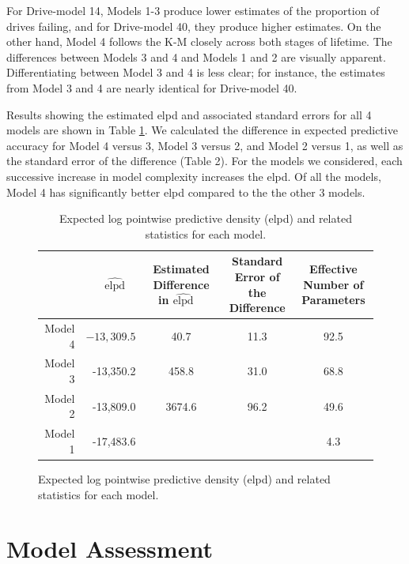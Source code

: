 \documentclass[11pt]{article}
\begin{document}
For Drive-model 14, Models 1-3 produce lower estimates of the proportion of drives failing, and for Drive-model 40, they produce higher estimates.  On the other hand, Model 4 follows the K-M closely across both stages of lifetime.  The differences between Models 3 and 4 and Models 1 and 2 are visually apparent.  Differentiating between Model 3 and 4 is less clear; for instance, the estimates from Model 3 and 4 are nearly identical for Drive-model 40.


Results showing the estimated elpd and associated standard errors for all 4 models are shown in Table \ref{table:2}.
We calculated the difference in expected predictive accuracy for Model 4 versus 3, Model 3 versus 2, and Model 2 versus 1, as well as the standard error of the difference (Table 2). For the models we considered, each successive increase in model complexity increases the elpd.  Of all the models, Model 4 has significantly better elpd compared to the the other 3 models.

\begin{figure}
\begin{table}[H]
\centering
\begin{tabular}{rrccc}
  \hline
 & $\widehat{\text{elpd}}$ \ & \thead{Estimated Difference \\ in $\widehat{\text{elpd}}$} \ & \thead{Standard Error of \\ the Difference} & \thead{Effective Number of \\ Parameters}\\ 
  \hline
Model 4 & $-13{,}309.5$ & 40.7 & 11.3 & 92.5 \\ 
Model 3 & -13{,}350.2 & 458.8 & 31.0 & 68.8 \\ 
Model 2 & -13{,}809.0 & 3674.6 & 96.2 & 49.6 \\ 
Model 1 & -17{,}483.6 &  &  & 4.3 \\
   \hline
\end{tabular}
\caption{\footnotesize Expected log pointwise predictive density (elpd) and related statistics for each model.}
\label{table:2}
\end{table}
\end{figure}

\section{Model Assessment}
\end{document}
